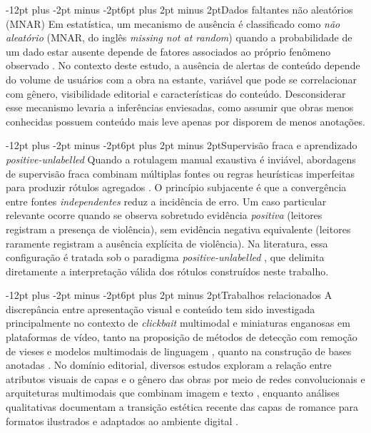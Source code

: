 \documentclass[12pt]{article}
\makeatletter
\renewcommand{\subsection}{\@startsection{subsection}{2}{\z@}%
  {-12pt plus -2pt minus -2pt}{6pt plus 2pt minus 2pt}{\normalfont\normalsize\bfseries}}
\makeatother
\begin{document}
\subsection{Dados faltantes não aleatórios (MNAR)}
Em estatística, um mecanismo de ausência é classificado como \emph{não aleatório} (MNAR, do inglês \emph{missing not at random}) quando a probabilidade de um dado estar ausente depende de fatores associados ao próprio fenômeno observado \cite{TODO-mnar}. No contexto deste estudo, a ausência de alertas de conteúdo depende do volume de usuários com a obra na estante, variável que pode se correlacionar com gênero, visibilidade editorial e características do conteúdo. Desconsiderar esse mecanismo levaria a inferências enviesadas, como assumir que obras menos conhecidas possuem conteúdo mais leve apenas por disporem de menos anotações.

\subsection{Supervisão fraca e aprendizado \emph{positive-unlabelled}}
Quando a rotulagem manual exaustiva é inviável, abordagens de supervisão fraca combinam múltiplas fontes ou regras heurísticas imperfeitas para produzir rótulos agregados \cite{TODO-weak-supervision}. O princípio subjacente é que a convergência entre fontes \emph{independentes} reduz a incidência de erro. Um caso particular relevante ocorre quando se observa sobretudo evidência \emph{positiva} (leitores registram a presença de violência), sem evidência negativa equivalente (leitores raramente registram a ausência explícita de violência). Na literatura, essa configuração é tratada sob o paradigma \emph{positive-unlabelled} \cite{TODO-pu-learning}, que delimita diretamente a interpretação válida dos rótulos construídos neste trabalho.

\subsection{Trabalhos relacionados}
A discrepância entre apresentação visual e conteúdo tem sido investigada principalmente no contexto de \emph{clickbait} multimodal e miniaturas enganosas em plataformas de vídeo, tanto na proposição de métodos de detecção com remoção de vieses \cite{yu2024multimodal} e modelos multimodais de linguagem \cite{naveed2025thumbnailtruth}, quanto na construção de bases anotadas \cite{islam2026ytclickbait21k}. No domínio editorial, diversos estudos exploram a relação entre atributos visuais de capas e o gênero das obras por meio de redes convolucionais e arquiteturas multimodais que combinam imagem e texto \cite{iwana2016judging,kundu2020deepmultimodal,yang2025enhancing}, enquanto análises qualitativas documentam a transição estética recente das capas de romance para formatos ilustrados e adaptados ao ambiente digital \cite{leenstra2023covers}.
\end{document}
